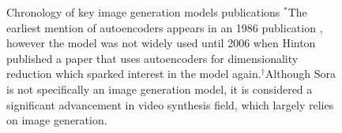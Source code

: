 \begin{figure}[H]
    \centering
    \caption{Chronology of key image generation models publications $^*$The earliest mention of autoencoders appears in an 1986 publication \cite{autoencoder_original_paper_1986}, however the model was not widely used until 2006 when Hinton published a paper that uses autoencoders for dimensionality reduction \cite{autoencoder_2006_paper} which sparked interest in the model again.$^\dag$Although Sora \cite{sora_website} is not specifically an image generation model, it is considered a significant advancement in video synthesis field, which largely relies on image generation.}
    \label{fig:timeline}
  \end{figure}